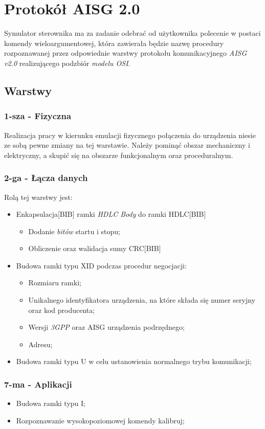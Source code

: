 \chapter{Protokół AISG 2.0}
	Symulator sterownika ma za zadanie odebrać od użytkownika polecenie w postaci komendy wieloargumentowej, 
	która zawierała będzie nazwę procedury rozpoznawanej przez odpowiednie warstwy protokołu komunikacyjnego \textit{AISG v2.0}
	realizującego podzbiór \textit{modelu OSI}.
	
	\section{Warstwy}
		\subsection{1-sza - Fizyczna}
		Realizacja pracy w kierunku emulacji fizycznego połączenia do urządzenia niesie ze sobą pewne zmiany na tej warstawie.\newline
		Należy pominąć obszar mechaniczny i elektryczny\cite{ETSI-3GPP-0}, a skupić się na obszarze funkcjonalnym oraz proceduralnym.
		\subsection{2-ga - Łącza danych}
		Rolą tej warstwy jest:
		\begin{itemize}
			\item Enkapsulacja[BIB] ramki \textit{HDLC Body} do ramki HDLC[BIB]
			\begin{itemize}
				\item Dodanie \textit{bitów} startu i stopu;
				\item Obliczenie oraz walidacja sumy CRC[BIB]
			\end{itemize}
			\item Budowa ramki typu XID podczas procedur negocjacji:
			\begin{itemize}
				\item Rozmiaru ramki;
				\item Unikalnego identyfikatora urządzenia, na które składa się numer seryjny oraz kod producenta;
				\item Wersji \textit{3GPP} oraz AISG urządzenia podrzędnego;
				\item Adresu;
			\end{itemize}
			\item Budowa ramki typu U w celu ustanowienia normalnego trybu komunikacji;
		\end{itemize}
		\subsection{7-ma - Aplikacji}
			\begin{itemize}
				\item Budowa ramki typu I;
				\item Rozpoznawanie wysokopoziomowej komendy kalibruj;
			\end{itemize}